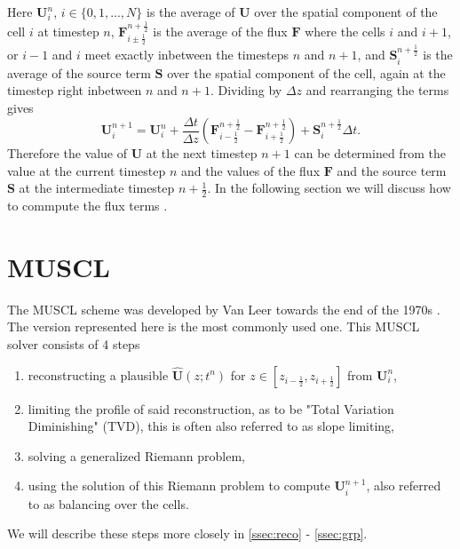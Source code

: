 \documentclass[a4paper, oneside]{discothesis}
\begin{document}
Here $\mathbf{U}_i^n$, $i \in \{0,1,...,N\}$ is the average of $\mathbf{U}$ over the spatial component of the cell $i$ at timestep $n$,
$\mathbf{F}_{i \pm \frac{1}{2}}^{n + \frac{1}{2}}$ is the average of the flux $\mathbf{F}$ where the cells $i$ and $i+1$, or  $i-1$ and $i$  meet exactly inbetween the timesteps $n$ and $n + 1$, and $\mathbf{S}_i^{n+\frac{1}{2}}$ is the average of the source term $\mathbf{S}$ over the spatial component of the cell, again at the timestep right inbetween $n$ and $n+1$.
Dividing by $\Delta z$ and rearranging the terms gives
\begin{equation}
	\mathbf{U} _i^{n+1} = \mathbf{U}_i^n + \frac{\Delta t}{\Delta z} (\mathbf{F}_{i-\frac{1}{2}}^{n+\frac{1}{2}} - \mathbf{F}_{i+\frac{1}{2}}^{n+\frac{1}{2}}) + \mathbf{S}_i^{n+\frac{1}{2}} \Delta t. \label{eq:fv}
\end{equation}
Therefore the value of $\mathbf{U}$ at the next timestep $n+1$ can be determined from the value at the current timestep $n$ and the values of the flux $\mathbf{F}$ and the source term $\mathbf{S}$ at the intermediate timestep $n + \frac{1}{2}$.
In the following section we will discuss how to commpute the flux terms \cite{guinot2012wave}.
\section{MUSCL} \label{sec:muscl}
The MUSCL scheme was developed by Van Leer towards the end of the 1970s \cite{van1977towards} \cite{van1979towards}.
The version represented here is the most commonly used one.
This MUSCL solver consists of 4 steps
\begin{enumerate}
	\item reconstructing a plausible $\mathbf{\hat{U}}(z;t^n)$ for $z \in [z_{i-\frac{1}{2}}, z_{i+\frac{1}{2}}]$ from $\mathbf{U}_i^n$,
	\item limiting the profile of said reconstruction, as to be "Total Variation Diminishing" (TVD), this is often also referred to as slope limiting,
	\item solving a generalized Riemann problem,
	\item using the solution of this Riemann problem to compute $\mathbf{U}_i^{n+1}$, also referred to as balancing over the cells.
\end{enumerate}
We will describe these steps more closely in \autoref{ssec:reco} - \autoref{ssec:grp}.
\end{document}

